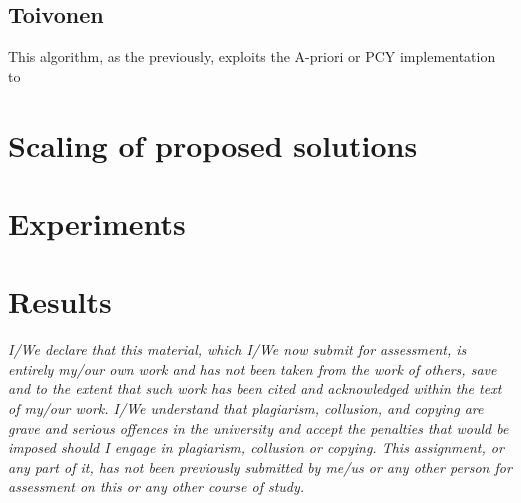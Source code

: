 \documentclass[14pt]{extarticle}
\begin{document}
\subsection{Toivonen}
This algorithm, as the previously, exploits the A-priori or PCY implementation  to 



\section{Scaling of proposed solutions}
\section{Experiments}
\section{Results}
{\it I/We declare that this material, which I/We now submit for assessment, is entirely my/our own work and has not been taken from the work of others, save and to the extent that such work has been cited and acknowledged within the text of my/our work. I/We understand that plagiarism, collusion, and copying are grave and serious offences in the university and accept the penalties that would be imposed should I engage in plagiarism, collusion or copying. This assignment, or any part of it, has not been previously submitted by me/us or any other person for assessment on this or any other course of study.}

\begin{comment}
The report should contain the following information:

-the chosen dataset, and the parts of the latter which have been considered,
-how data have been organized,
-the applied pre-processing techniques,
-the considered algorithms and their implementations,
-how the proposed solution scales up with data size,
-a description of the experiments,
-comments and discussion on the experimental results.

\end{comment}
\end{document}

